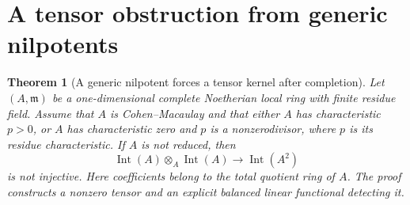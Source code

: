 \documentclass[11pt,a4paper]{article}
\newtheorem{theorem}{Theorem}[section]
\theoremstyle{definition}
\begin{document}
\section{A tensor obstruction from generic nilpotents}
\begin{theorem}[A generic nilpotent forces a tensor kernel after completion]\label{result-35}
Let $(A,\mathfrak m)$ be a one-dimensional complete
Noetherian local ring with finite residue field. Assume that
$A$ is Cohen--Macaulay and that either $A$ has characteristic
$p>0$, or $A$ has characteristic zero and $p$ is a
nonzerodivisor, where $p$ is its residue characteristic.
If $A$ is not reduced, then
\[
 \operatorname{Int}(A)\otimes_A\operatorname{Int}(A)
       \longrightarrow\operatorname{Int}(A^2)
\]
is not injective. Here coefficients belong to the total
quotient ring of $A$. The proof constructs a nonzero tensor
and an explicit balanced linear functional detecting it.
\end{theorem}
\end{document}
